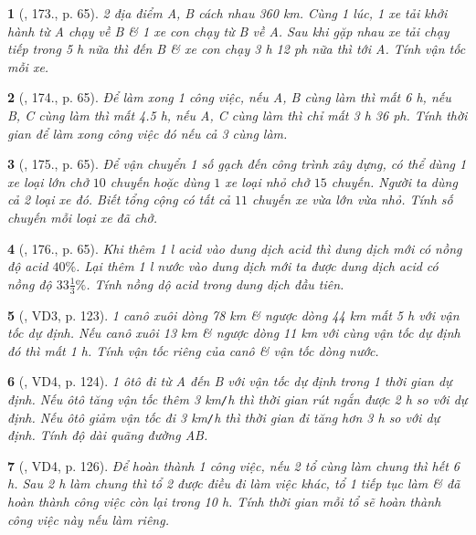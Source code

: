 \documentclass{article}
\newtheorem{baitoan}{}
\begin{document}
\begin{baitoan}[\cite{Tuyen_Toan_9_old}, 173., p. 65]
	2 địa điểm A, B cách nhau {\rm360 km}. Cùng 1 lúc, 1 xe tải khởi hành từ A chạy về B \& 1 xe con chạy từ B về A. Sau khi gặp nhau xe tải chạy tiếp trong {\rm5 h} nữa thì đến B \& xe con chạy {\rm3 h 12 ph} nữa thì tới A. Tính vận tốc mỗi xe.
\end{baitoan}

\begin{baitoan}[\cite{Tuyen_Toan_9_old}, 174., p. 65]
	Để làm xong 1 công việc, nếu A, B cùng làm thì mất {\rm6 h}, nếu B, C cùng làm thì mất {\rm4.5 h}, nếu A, C cùng làm thì chỉ mất {\rm3 h 36 ph}. Tính thời gian để làm xong công việc đó nếu cả 3 cùng làm.
\end{baitoan}

\begin{baitoan}[\cite{Tuyen_Toan_9_old}, 175., p. 65]
	Để vận chuyển 1 số gạch đến công trình xây dựng, có thể dùng 1 xe loại lớn chở $10$ chuyến hoặc dùng $1$ xe loại nhỏ chở $15$ chuyến. Người ta dùng cả 2 loại xe đó. Biết tổng cộng có tất cả $11$ chuyến xe vừa lớn vừa nhỏ. Tính số chuyến mỗi loại xe đã chở.
\end{baitoan}

\begin{baitoan}[\cite{Tuyen_Toan_9_old}, 176., p. 65]
	Khi thêm {\rm 1 l} acid vào dung dịch acid thì dung dịch mới có nồng độ acid $40\%$. Lại thêm {\rm 1 l} nước vào dung dịch mới ta được dung dịch acid có nồng độ $33\frac{1}{3}\%$. Tính nồng dộ acid trong dung dịch đầu tiên.
\end{baitoan}

\begin{baitoan}[\cite{Kien_dai_so_9}, VD3, p. 123]
	1 canô xuôi dòng {\rm78 km} \& ngược dòng {\rm44 km} mất {\rm5 h} với vận tốc dự định. Nếu canô xuôi {\rm13 km} \& ngược dòng {\rm11 km} với cùng vận tốc dự định đó thì mất {\rm1 h}. Tính vận tốc riêng của canô \& vận tốc dòng nước.
\end{baitoan}

\begin{baitoan}[\cite{Kien_dai_so_9}, VD4, p. 124]
	1 ôtô đi từ A đến B với vận tốc dự định trong 1 thời gian dự định. Nếu ôtô tăng vận tốc thêm {\rm3 km{\tt/}h} thì thời gian rút ngắn được {\rm2 h} so với dự định. Nếu ôtô giảm vận tốc đi {\rm3 km{\tt/}h} thì thời gian đi tăng hơn {\rm3 h} so với dự định. Tính độ dài quãng đường AB.
\end{baitoan}

\begin{baitoan}[\cite{Kien_dai_so_9}, VD4, p. 126]
	Để hoàn thành 1 công việc, nếu 2 tổ cùng làm chung thì hết {\rm6 h}. Sau {\rm2 h} làm chung thì tổ 2 được điều đi làm việc khác, tổ 1 tiếp tục làm \& đã hoàn thành công việc còn lại trong {\rm10 h}. Tính thời gian mỗi tổ sẽ hoàn thành công việc này nếu làm riêng.
\end{baitoan}
\end{document}

